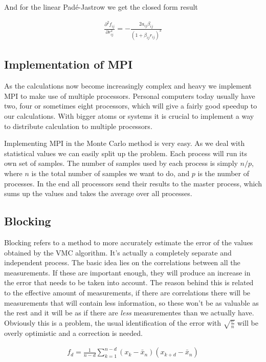 \documentclass[11pt]{article}
\begin{document}
			And for the linear Padé-Jastrow we get the closed form result

			\begin{align}
				\frac{\partial^{2}f_{ij}}{\partial r_{ij}^{2}}=-\frac{2a_{ij}\beta_{ij}}{\left(1+\beta_{ij}r_{ij}\right)^{3}}
			\end{align}

	\subsection{Implementation of MPI}
		As the calculations now become increasingly complex and heavy we implement MPI to make use of multiple processors. Personal computers today usually have two, four or sometimes eight processors, which will give a fairly good speedup to our calculations. With bigger atoms or systems it is crucial to implement a way to distribute calculation to multiple processors.

		Implementing MPI in the Monte Carlo method is very easy. As we deal with statistical values we can easily split up the problem. Each process will run its own set of samples. The number of samples used by each process is simply $n/p$, where $n$ is the total number of samples we want to do, and $p$ is the number of processes. In the end all processors send their results to the master process, which sums up the values and takes the average over all processes.

	\subsection{Blocking}
		Blocking refers to a method to more accurately estimate the error of the values obtained by the VMC algorithm. It's actually a completely separate and independent process. The basic idea lies on the correlations between all the measurements. If these are important enough, they will produce an increase in the error that needs to be taken into account. The reason behind this is related to the effective amount of measurements, if there are correlations there will be measurements that will contain less information, so these won't be as valuable as the rest and it will be as if there are \textit{less} measurementes than we actually have. Obviously this is a problem, the usual identification of the error with $\sqrt{\frac{\sigma}{n}}$ will be overly optimistic and a correction is needed.

		\begin{align}
			f_d=\frac{1}{n-d}\sum_{k=1}^{n-d}{\left(x_k-\bar{x}_n\right)\left(x_{k+d}-\bar{x}_n\right)}
		\end{align}
\end{document}
